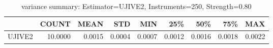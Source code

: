 \begin{table}[ht]
\centering
\caption{variance summary: Estimator=UJIVE2, Instruments=250, Strength=0.80}
\begin{tabular}{lrrrrrrrr}
\toprule
 & COUNT & MEAN & STD & MIN & 25\% & 50\% & 75\% & MAX \\
\midrule
UJIVE2 & 10.0000 & 0.0015 & 0.0004 & 0.0007 & 0.0012 & 0.0016 & 0.0018 & 0.0022 \\
\bottomrule
\end{tabular}
\end{table}
